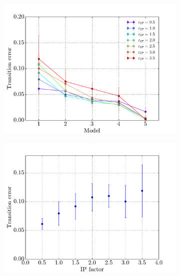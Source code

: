 \begin{figure}[!t]
    \centering
    \begin{subfigure}{0.48\textwidth}
    	\centering
        \includegraphics[width=\textwidth]{results/h_ip}
        \caption{}
        \label{fig:hip-allmodels}
    \end{subfigure}
    \hfill
    \begin{subfigure}{0.48\textwidth}
    	\centering
        \includegraphics[width=\textwidth]{results/h_ip_model1}
        \caption{}
        \label{fig:hip-model1}
    \end{subfigure}
    \begin{subfigure}{0.48\textwidth}
    	\centering

\end{subfigure}
\end{figure}
